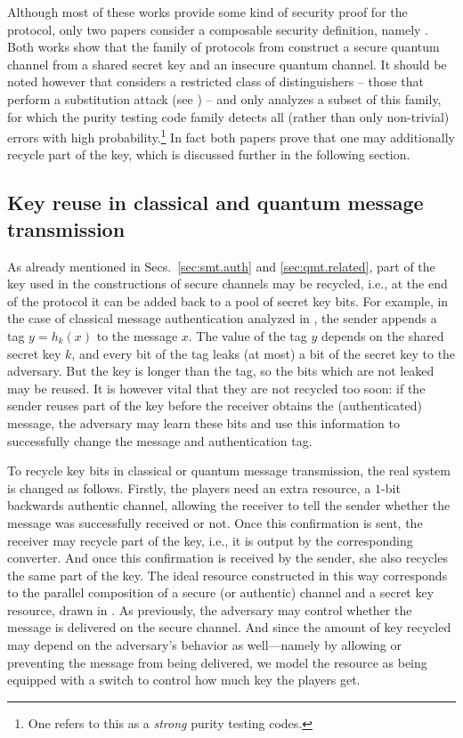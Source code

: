 Although most of these works provide some kind of security proof for
the protocol, only two papers consider a composable security
definition, namely \textcite{HLM11,Por17}. Both works show that the
family of protocols from \textcite{BCGST02} construct a secure quantum
channel from a shared secret key and an insecure quantum channel. It
should be noted however that \textcite{HLM11} considers a restricted
class of distinguishers \--- those that perform a substitution attack
(see ) \--- and \textcite{Por17} only analyzes a
subset of this family, for which the purity testing code family
detects all (rather than only non-trivial) errors with high
probability.\footnote{One refers to this as a \emph{strong} purity
  testing codes.} In fact both papers prove that one may additionally
recycle part of the key, which is discussed further in the following
section.


\subsection{Key reuse in classical and quantum message transmission}
\label{sec:recycle}

As already mentioned in Secs.~\ref{sec:smt.auth} and
\ref{sec:qmt.related}, part of the key used in the constructions of
secure channels may be recycled, i.e., at the end of the protocol it
can be added back to a pool of secret key bits. For example, in the
case of classical message authentication analyzed in
, the sender appends a tag $y = h_k(x)$ to the
message $x$. The value of the tag $y$ depends on the shared secret key
$k$, and every bit of the tag leaks (at most) a bit of the secret key
to the adversary. But the key is longer than the tag, so the bits
which are not leaked may be reused. It is however vital that they are
not recycled too soon: if the sender reuses part of the key before the
receiver obtains the (authenticated) message, the adversary may learn
these bits and use this information to successfully change the message
and authentication tag.

To recycle key bits in classical or quantum message transmission, the
real system is changed as follows. Firstly, the players need an extra
resource, a $1$-bit backwards authentic channel, allowing the receiver
to tell the sender whether the message was successfully received or
not. Once this confirmation is sent, the receiver may recycle part of
the key, i.e., it is output by the corresponding converter. And once
this confirmation is received by the sender, she also recycles the
same part of the key. The ideal resource constructed in this way
corresponds to the parallel composition of a secure (or authentic)
channel and a secret key resource, drawn in
. As previously, the adversary may
control whether the message is delivered on the secure channel. And
since the amount of key recycled may depend on the adversary's
behavior as well---namely by allowing or preventing the message from
being delivered, we model the resource as being equipped with a switch
to control how much key the players get.

